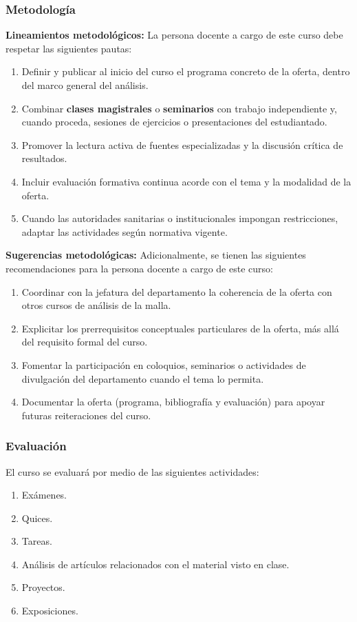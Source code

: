 \begin{refsection}
\subsubsection*{Metodología}

\noindent \textbf{Lineamientos metodológicos:} La persona docente a cargo de este curso debe respetar las siguientes pautas:

\begin{enumerate}
    \item Definir y publicar al inicio del curso el programa concreto de la oferta, dentro del marco general del análisis.
    \item Combinar \textbf{clases magistrales} o \textbf{seminarios} con trabajo independiente y, cuando proceda, sesiones de ejercicios o presentaciones del estudiantado.
    \item Promover la lectura activa de fuentes especializadas y la discusión crítica de resultados.
    \item Incluir evaluación formativa continua acorde con el tema y la modalidad de la oferta.
    \item Cuando las autoridades sanitarias o institucionales impongan restricciones, adaptar las actividades según normativa vigente.
\end{enumerate}

\textbf{Sugerencias metodológicas:} Adicionalmente, se tienen las siguientes recomendaciones para la persona docente a cargo de este curso:

\begin{enumerate}
    \item Coordinar con la jefatura del departamento la coherencia de la oferta con otros cursos de análisis de la malla.
    \item Explicitar los prerrequisitos conceptuales particulares de la oferta, más allá del requisito formal del curso.
    \item Fomentar la participación en coloquios, seminarios o actividades de divulgación del departamento cuando el tema lo permita.
    \item Documentar la oferta (programa, bibliografía y evaluación) para apoyar futuras reiteraciones del curso.
\end{enumerate}

\subsubsection*{Evaluación}

El curso se evaluará por medio de las siguientes actividades:

\begin{enumerate}
\item Exámenes.
\item Quices.
\item Tareas.
\item Análisis de artículos relacionados con el material visto en clase.
\item Proyectos.
\item Exposiciones.
\end{enumerate}

\printcursosbibliography

\end{refsection}
